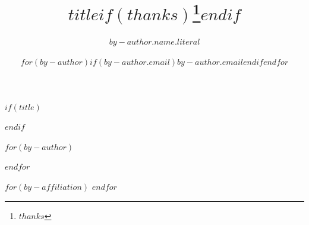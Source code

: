 $if(title)$
\title{$title$$if(thanks)$\thanks{$thanks$}$endif$}
$endif$

$for(by-author)$
\author[$for(it.affiliations)$$it.number$$sep$,$endfor$]{$by-author.name.literal$}
$endfor$

$for(by-affiliation)$
$endfor$

\date{$for(by-author)$$if(by-author.email)$\href{mailto:$by-author.email$}{$by-author.email$}$endif$$endfor$}
